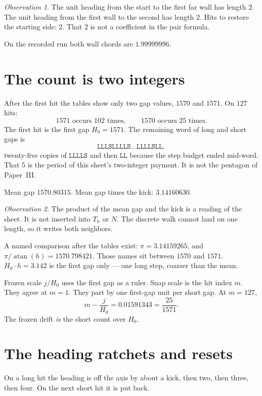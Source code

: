 \documentclass[10pt,a4paper]{article}
\theoremstyle{plain}
\theoremstyle{definition}
\theoremstyle{remark}
\newtheorem{observation}{Observation}
\begin{document}
\begin{observation}
The unit heading from the start to the first far wall has length \(2\).
The unit heading from the first wall to the second has length \(2\).
Hits to restore the starting side: \(2\).
That \(2\) is not a coefficient in the pair formula.
\end{observation}

On the recorded run both wall chords are \(1.99999996\).

\section{The count is two integers}

After the first hit the tables show only two gap values, \(1570\) and \(1571\).
On \(127\) hits:
\[
1571\text{ occurs }102\text{ times},\qquad
1570\text{ occurs }25\text{ times}.
\]
The first hit is the first gap \(H_0=1571\).
The remaining word of long and short gaps is
\[
\texttt{LLLSLLLLS}\ldots\texttt{LLLLSLL},
\]
twenty-five copies of \(\texttt{LLLLS}\) and then \(\texttt{LL}\) because the step budget ended mid-word.
That \(5\) is the period of this sheet's two-integer payment.
It is not the pentagon of Paper~III.

Mean gap \(1570.80315\).
Mean gap times the kick: \(3.14160630\).

\begin{observation}
The product of the mean gap and the kick is a reading of the sheet.
It is not inserted into \(T_h\) or \(N\).
The discrete walk cannot land on one length, so it writes both neighbors.
\end{observation}

A named comparison after the tables exist: \(\pi=3.14159265\), and \(\pi/\operatorname{atan}(h)=1570.798421\).
Those names sit between \(1570\) and \(1571\).
\(H_0\cdot h=3.142\) is the first gap only --- one long step, coarser than the mean.

Frozen scale \(j/H_0\) uses the first gap as a ruler.
Snap scale is the hit index \(m\).
They agree at \(m=1\).
They part by one first-gap unit per short gap.
At \(m=127\),
\[
m-\frac{j}{H_0}=0.01591343=\frac{25}{1571}.
\]
The frozen drift \emph{is} the short count over \(H_0\).

\section{The heading ratchets and resets}

On a long hit the heading is off the axis by about a kick, then two, then three, then four.
On the next short hit it is put back.
\end{document}
